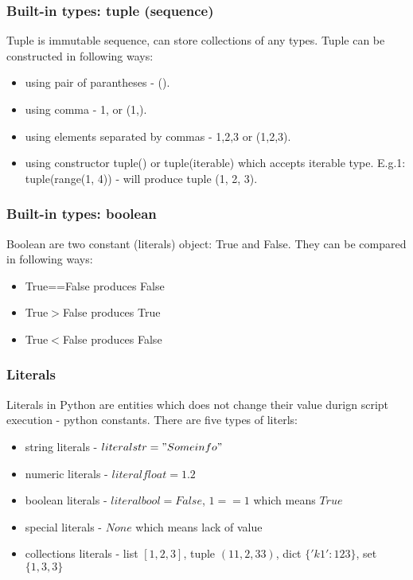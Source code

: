\documentclass{article}
\begin{document}
	\subsubsection{Built-in types: tuple (sequence)}
	Tuple is immutable sequence, can store collections of any types. Tuple can be constructed in following ways:
	\begin{itemize}
	\item using pair of parantheses - ().
	\item using comma - 1, or (1,).
	\item using elements separated by commas - 1,2,3 or (1,2,3).
	\item \raggedright using constructor tuple() or tuple(iterable) which accepts iterable type. \linebreak E.g.1: tuple(range(1, 4)) - will produce tuple (1, 2, 3).
	\end{itemize}
	
	\subsubsection{Built-in types: boolean}
	Boolean are two constant (literals) object: True and False. They can be compared in following ways:
	\begin{itemize}
	\item True==False produces False
	\item True$>$False produces True
	\item True$<$False produces False
	\end{itemize}
	
	\subsubsection{Literals}
	Literals in Python are entities which does not change their value durign script execution - python constants. There are five types of literls:
	\begin{itemize}
	\item string literals - $literalstr="Some info"$
	\item numeric literals - $literalfloat=1.2$
	\item boolean literals - $literalbool=False$, $1==1$ which means $True$
	\item special literals - $None$ which means lack of value
	\item collections literals - list $[1,2,3]$, tuple $(11,2,33)$, dict $\{'k1': 123\}$, set $\{1, 3, 3\}$ 	
	\end{itemize}
\end{document}
